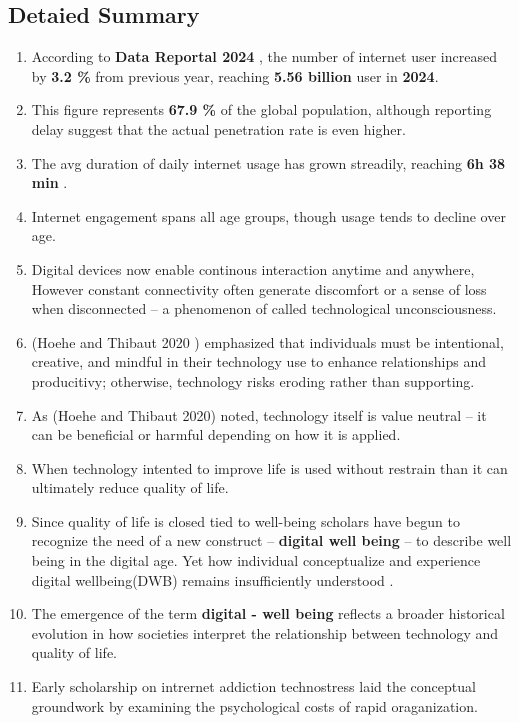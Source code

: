 \documentclass[12pt]{article}
\begin{document}
\subsection{Detaied Summary}
\begin{enumerate}
    \item According to \textbf{Data Reportal 2024} \cite{datareportal2024digital}, the number of internet user increased by \textbf{3.2 \% } from previous year, reaching \textbf{5.56 billion } user in \textbf{2024}. 
    \item This  figure represents \textbf{67.9 \%} of the global population, although reporting delay suggest that the actual penetration rate is even higher.
    \item The avg duration of daily internet usage has grown streadily, reaching \textbf{6h 38 min} .
    \item Internet engagement spans all age groups, though usage tends to decline over age.
    \item Digital devices now enable continous interaction anytime and anywhere, However constant connectivity often generate discomfort or a sense of loss when disconnected -- a phenomenon of called technological unconsciousness.
    \item (Hoehe and Thibaut 2020 )\cite{hoehe2020going} emphasized that individuals must be intentional, creative, and mindful in their technology use to enhance relationships and producitivy; otherwise, technology risks eroding rather than supporting.
    \item   As (Hoehe and Thibaut 2020) \cite{hoehe2020going} noted, technology itself is value neutral -- it can be beneficial or harmful depending on how it is applied.
    \item When technology intented to improve life is used without restrain than it can 
    ultimately reduce quality of life.
    \item Since quality of life is closed tied to well-being \cite{upton2015quality}  \cite{weil1997technostress} scholars have begun to recognize the need of a new construct -- \textbf{digital well being} -- to describe well being in the digital age.
    \iten Yet how individual conceptualize and experience digital wellbeing(DWB) remains insufficiently understood \cite{nguyen2022everyday}.
    \item The emergence of the term \textbf{digital - well being } reflects a broader historical evolution in how societies interpret the relationship between technology and quality of life.
    \item Early scholarship on intrernet addiction \cite{kraut1998internet} technostress \cite{tarafdar2007technostress} laid the conceptual groundwork by examining the psychological costs of rapid oraganization.

\end{enumerate}
\end{document}
